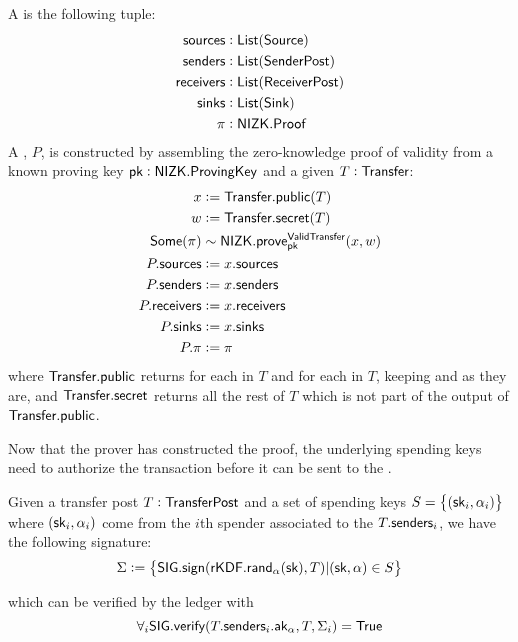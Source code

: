 \begin{definition}
    A \TransferPost{} is the following tuple:
    \begin{align*}
        {\textsf{sources}}    &: {\textsf{List}}({\textsf{Source}}) \\
        {\textsf{senders}}    &: {\textsf{List}}({\textsf{SenderPost}}) \\
        {\textsf{receivers}}  &: {\textsf{List}}({\textsf{ReceiverPost}}) \\
        {\textsf{sinks}}      &: {\textsf{List}}({\textsf{Sink}}) \\
        \pi         &: {\textsf{NIZK}}.{\textsf{Proof}} 
    \end{align*}
    A \TransferPost{}, $P$, is constructed by assembling the zero-knowledge proof of \Transfer{} validity from a known proving key ${\textsf{pk}} : {\textsf{NIZK}}.{\textsf{ProvingKey}}$ and a given $T : {\textsf{Transfer}}$:
    \begin{align*}
        x             &:= {\textsf{Transfer}}.{\textsf{public}}(T) \\
        w             &:= {\textsf{Transfer}}.{\textsf{secret}}(T) \\
        {\textsf{Some}}(\pi)    &\sim {\textsf{NIZK}}.{\textsf{prove}}^{\textsf{ValidTransfer}}_{\textsf{pk}}(x, w) \\
        P.{\textsf{sources}}    &:= x.{\textsf{sources}} \\
        P.{\textsf{senders}}    &:= x.{\textsf{senders}} \\
        P.{\textsf{receivers}}  &:= x.{\textsf{receivers}} \\
        P.{\textsf{sinks}}      &:= x.{\textsf{sinks}} \\
        P.\pi         &:= \pi
    \end{align*}
    where ${\textsf{Transfer}}.{\textsf{public}}$ returns  for each \Sender{} in $T$ and  for each \Receiver{} in $T$, keeping  and  as they are, and ${\textsf{Transfer}}.{\textsf{secret}}$ returns all the rest of $T$ which is not part of the output of ${\textsf{Transfer}}.{\textsf{public}}$.
\end{definition}

Now that the prover has constructed the proof, the underlying spending keys need to authorize the transaction before it can be sent to the \Ledger{}.

\begin{definition}
    Given a transfer post $T: {\textsf{TransferPost}}{}$ and a set of spending keys $S = \set{({\textsf{sk}}_i, \alpha_i)}$ where $({\textsf{sk}}_i, \alpha_i)$ come from the $i$th spender associated to the $T.{\textsf{senders}}_i$, we have the following signature:
    \[\Sigma := \set{{\textsf{SIG}}.{\textsf{sign}}({\textsf{rKDF}}.{\textsf{rand}}_\alpha({\textsf{sk}}), T) | ({\textsf{sk}}, \alpha) \in S}\]

    which can be verified by the ledger with 
    \[\forall_i{\textsf{SIG}}.{\textsf{verify}}(T.{\textsf{senders}}_i.{\textsf{ak}}_\alpha, T, \Sigma_i) = {\textsf{True}}\]
\end{definition}

